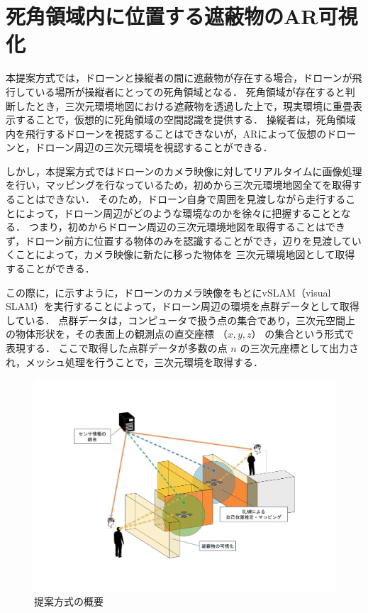 \documentclass[a4paper,11pt]{ujreport}
\begin{document}
\section{死角領域内に位置する遮蔽物のAR可視化}
\label{sec:ARvisualize}
本提案方式では，ドローンと操縦者の間に遮蔽物が存在する場合，ドローンが飛行している場所が操縦者にとっての死角領域となる．
死角領域が存在すると判断したとき，三次元環境地図における遮蔽物を透過した上で，現実環境に重畳表示することで，仮想的に死角領域の空間認識を提供する．
操縦者は，死角領域内を飛行するドローンを視認することはできないが，ARによって仮想のドローンと，ドローン周辺の三次元環境を視認することができる．

しかし，本提案方式ではドローンのカメラ映像に対してリアルタイムに画像処理を行い，マッピングを行なっているため，初めから三次元環境地図全てを取得することはできない．
そのため，ドローン自身で周囲を見渡しながら走行することによって，ドローン周辺がどのような環境なのかを徐々に把握することとなる．
つまり，初めからドローン周辺の三次元環境地図を取得することはできず，ドローン前方に位置する物体のみを認識することができ，辺りを見渡していくことによって，カメラ映像に新たに移った物体を
三次元環境地図として取得することができる．

この際に，に示すように，ドローンのカメラ映像をもとにvSLAM（visual SLAM）を実行することによって，ドローン周辺の環境を点群データとして取得している．
点群データは，コンピュータで扱う点の集合であり，三次元空間上の物体形状を，その表面上の観測点の直交座標 $（x,y,z）$ の集合という形式で表現する．
ここで取得した点群データが多数の点 $n$ の三次元座標として出力され，メッシュ処理を行うことで，三次元環境を取得する．

\begin{figure}[!tb]
  \centering
  \includegraphics[width=0.9\linewidth]{img/03_outline.pdf}
  \caption{提案方式の概要}
  \label{fig:03_outline}
\end{figure}
\end{document}
